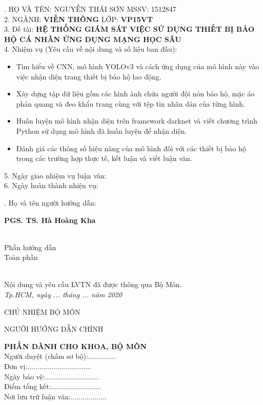 \documentclass[12pt]{report}
\begin{document}
{. HỌ VÀ TÊN: NGUYỄN THÁI SƠN \hfill MSSV: 1512847\\
2. NGÀNH: \textbf{VIỄN THÔNG} \hfill LỚP: \textbf{VP15VT}\\
3. Đề tài: \textbf{HỆ THỐNG GIÁM SÁT VIỆC SỬ DỤNG THIẾT BỊ BẢO HỘ CÁ NHÂN ỨNG DỤNG MẠNG HỌC SÂU}\\
4. Nhiệm vụ (Yêu cầu về nội dung và số liệu ban đầu):
\begin{itemize}[topsep=0pt,itemsep=-1ex,partopsep=1ex,parsep=1ex]
	\item Tìm hiểu về CNN, mô hình YOLOv3 và cách ứng dụng của mô hình này vào việc nhận diện trang thiết bị bảo hộ lao động.
	\item Xây dựng tập dữ liệu gồm các hình ảnh chứa người đội nón bảo hộ, mặc áo phản quang và đeo khẩu trang cùng với tệp tin nhãn dán của từng hình.
	\item Huấn luyện mô hình nhận diện trên framework darknet và viết chương trình Python sử dụng mô hình đã huấn luyện để nhận diện.
	\item Đánh giá các thông số hiệu năng của mô hình đối với các thiết bị bảo hộ trong các trường hợp thực tế, kết luận và viết luận văn.
\end{itemize}
5. Ngày giao nhiệm vụ luận văn:\dotfill\\
6. Ngày hoàn thành nhiện vụ:\dotfill
\linespread{0.0}\vspace{-0.7em}
\begin{multicols}{2}
	. Họ và tên người hướng dẫn:
	\begin{center}
	\dotfill \textbf{PGS. TS. Hà Hoàng Kha} \dotfill\\
	\dotfill \\
	\end{center}
	\columnbreak
	\begin{center}
	Phần hướng dẫn\\
	\dotfill Toàn phần \dotfill\\
	\dotfill \\
	\end{center}
\linespread{0.0}\vspace{-0.7em}
\end{multicols}
\noindent
Nội dung và yêu cầu LVTN đã được thông qua Bộ Môn.\\
\textit{Tp.HCM, ngày ... tháng ... năm 2020}
\begin{multicols}{2}
	\begin{center}
		CHỦ NHIỆM BỘ MÔN
	\end{center}
	\columnbreak
	\begin{center}
		NGƯỜI HƯỚNG DẪN CHÍNH
	\end{center}
\end{multicols}
\vfill
\noindent
\textbf{PHẦN DÀNH CHO KHOA, BỘ MÔN}\\
Người duyệt (chấm sơ bộ):..............\\
Đơn vị:................................\\
Ngày bảo vệ:...........................\\
Điểm tổng kết:.........................\\
Nơi lưu trữ luận văn:..................
}
\newpage
\end{document}
